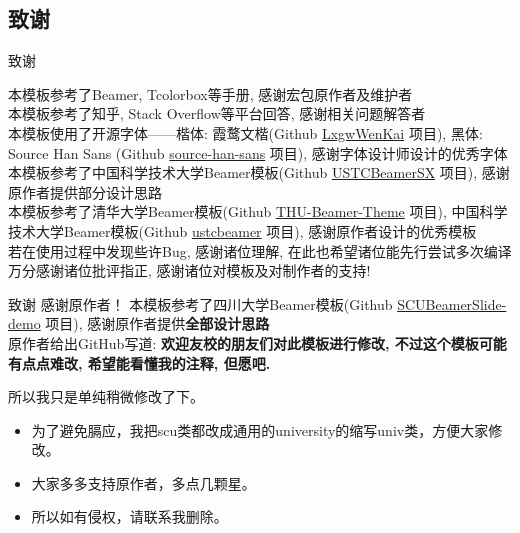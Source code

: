 \documentclass[hyperref, UTF8, CJK, aspectratio=169]{beamer}
\begin{document}
\subsection{致谢}
\begin{frame}{致谢}
	\begin{center}
		本模板参考了Beamer, Tcolorbox等手册, 感谢宏包原作者及维护者\\[1ex]
		本模板参考了知乎, Stack Overflow等平台回答, 感谢相关问题解答者\\[1ex]
		本模板使用了开源字体——楷体: 霞鹜文楷(Github \href{https://github.com/lxgw/LxgwWenKai/}{\color{univblue}LxgwWenKai} 项目), 黑体: Source Han Sans (Github \href{https://github.com/adobe-fonts/source-han-sans/}{\color{univblue}source-han-sans} 项目), 感谢字体设计师设计的优秀字体\\[1ex]
		本模板参考了中国科学技术大学Beamer模板(Github \href{https://github.com/ysx2000/USTCBeamerSX/}{\color{univblue}USTCBeamerSX} 项目), 感谢原作者提供部分设计思路\\[1ex]
		本模板参考了清华大学Beamer模板(Github \href{https://github.com/tuna/THU-Beamer-Theme/}{\color{univblue}THU-Beamer-Theme} 项目), 中国科学技术大学Beamer模板(Github \href{https://github.com/ustctug/ustcbeamer/}{\color{univblue}ustcbeamer} 项目), 感谢原作者设计的优秀模板\\[1ex]
		
		若在使用过程中发现些许Bug, 感谢诸位理解, 在此也希望诸位能先行尝试多次编译\\[1ex]
		万分感谢诸位批评指正, 感谢诸位对模板及对制作者的支持!
	\end{center}
\end{frame}
\begin{frame}{致谢}
		感谢原作者！
		本模板参考了四川大学Beamer模板(Github \href{https://github.com/FvNCCR228/SCU_Beamer_Slide-demo}{\color{univblue}SCUBeamerSlide-demo} 项目), 感谢原作者提供\textbf{全部设计思路}\\
		
		原作者给出GitHub写道:
		\textbf{欢迎友校的朋友们对此模板进行修改, 不过这个模板可能有点点难改, 希望能看懂我的注释, 但愿吧.}
		
		所以我只是单纯稍微修改了下。
		
		\begin{itemize}
		\item 为了避免膈应，我把scu类都改成通用的university的缩写univ类，方便大家修改。
		\item  大家多多支持原作者，多点几颗星。
		\item  所以如有侵权，请联系我删除。
		\end{itemize}
\end{frame}
\end{document}
